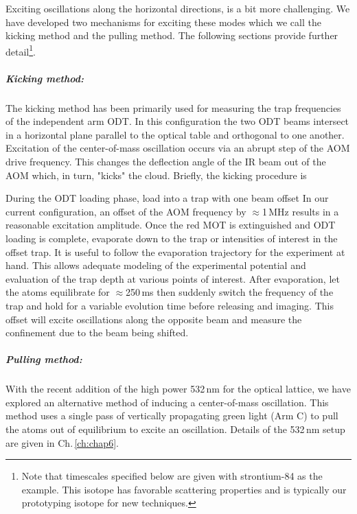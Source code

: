 Exciting oscillations along the horizontal directions, is a bit more challenging.
We have developed two mechanisms for exciting these modes which we call the kicking method and the pulling method.
The following sections provide further detail\footnote{Note that timescales specified below are given with strontium-84 as the example.
This isotope has favorable scattering properties and is typically our prototyping isotope for new techniques.}.

\subparagraph{Kicking method:}
The kicking method has been primarily used for measuring the trap frequencies of the independent arm ODT.
In this configuration the two ODT beams  intersect in a horizontal plane parallel to the optical table and orthogonal to one another.
Excitation of the center-of-mass oscillation occurs via an abrupt step of the AOM drive frequency.
This changes the deflection angle of the IR beam out of the AOM which, in turn, "kicks" the cloud.
Briefly, the kicking procedure is 
\begin{outline}[enumerate]
	\1 During the ODT loading phase, load into a trap with one beam offset
		\2 In our current configuration, an offset of the AOM frequency by $\approx$1\,MHz results in a reasonable excitation amplitude.
	\1 Once the red MOT is extinguished and ODT loading is complete, evaporate down to the trap or intensities of interest in the offset trap.
		\2 It is useful to follow the evaporation trajectory for the experiment at hand. This allows adequate modeling of the experimental potential and evaluation of the trap depth at various points of interest.
	\1 After evaporation, let the atoms equilibrate for $\approx$250\,ms then suddenly switch the frequency of the trap and hold for a variable evolution time before releasing and imaging.
		\2 This offset will excite oscillations along the opposite beam and measure the confinement due to the beam being shifted.
\end{outline}

\subparagraph{Pulling method:}
With the recent addition of the high power 532\,nm for the optical lattice, we have explored an alternative method of inducing a center-of-mass oscillation. 
This method uses a single pass of vertically propagating green light (Arm C) to pull the atoms out of equilibrium to excite an oscillation.
Details of the 532\,nm setup are given in Ch.\,\ref{ch:chap6}.

